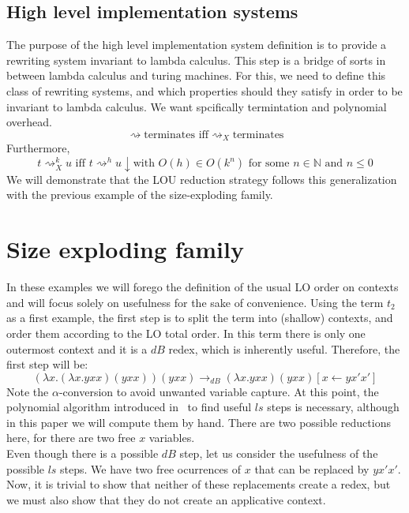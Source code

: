 \documentclass[12pt]{article}
\begin{document}
\subsection{High level implementation systems}
The purpose of the high level implementation system definition is to provide a rewriting system invariant to lambda calculus. This step is a bridge of sorts in between lambda calculus and turing machines. For this, we need to define this class of rewriting systems, and which properties should they satisfy in order to be invariant to lambda calculus. We want spcifically termintation and polynomial overhead.
\[\rightsquigarrow \text{terminates iff} {\rightsquigarrow}_{X} \text{terminates}\]
Furthermore,
\[t {\rightsquigarrow}_{X}^k u \text{ iff } t {\rightsquigarrow}^h u\downarrow \text{with } O(h) \in O(k^n) \text{ for some } n \in \mathbb{N} \text{ and } n \leq 0 \]
We will demonstrate that the LOU reduction strategy follows this generalization with the previous example of the size-exploding family.
\section{Size exploding family}
In these examples we will forego the definition of the usual LO order on contexts and will focus solely on usefulness for the sake of convenience.
Using the term $t_2$ as a first example, the first step is to split the term into (shallow) contexts, and order them according to the LO total order. In this term there is only one outermost context and it is a $dB$ redex, which is inherently useful. Therefore, the first step will be:
\begin{equation*}
  (\lambda x . (\lambda x . yxx) (yxx))(yxx) \rightarrow_{dB} (\lambda x . yxx)(yxx)[x \leftarrow yx'x']
\end{equation*}
Note the $\alpha$-conversion to avoid unwanted variable capture. At this point, the polynomial algorithm introduced in~\cite{beta-invariance} to find useful $ls$ steps is necessary, although in this paper we will compute them by hand. There are two possible reductions here, for there are two free $x$ variables.  \\
Even though there is a possible $dB$ step, let us consider the usefulness of the possible $ls$ steps. We have two free ocurrences of $x$ that can be replaced by $yx'x'$. Now, it is trivial to show that neither of these replacements create a redex, but we must also show that they do not create an applicative context.
\end{document}
